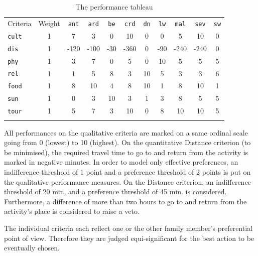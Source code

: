 \begin{table}[ht]
\caption{The performance tableau}
\label{tab:15.5}       %
\begin{center}
\begin{small}
    \begin{tabular}{l c|c c c c c c c c c}
      \svhline\noalign{\smallskip}
      Criteria & Weight & \texttt{ant} & \texttt{ard} & \texttt{be} & \texttt{crd} & \texttt{dn} & \texttt{lw} & \texttt{mal} & \texttt{sev} & \texttt{sw} \\
      \noalign{\smallskip}\hline\noalign{\smallskip}
      \texttt{cult} & 1 & 7    & 3    & 0   & 10   & 0 & 0   & 5    & 10   & 0\\
      \texttt{dis}  & 1 & -120 & -100 & -30 & -360 & 0 & -90 & -240 & -240 & 0\\
      \texttt{phy}  & 1 & 3    & 7    & 0   & 5    & 0 & 10  & 5    & 5    & 5\\
      \texttt{rel}  & 1 & 1    & 5    & 8   & 3    & 10 & 5  & 3    & 3   & 6\\
      \texttt{food} & 1 & 8    & 10   & 4   & 8    & 10 & 1  & 8    & 10  & 1\\
      \texttt{sun}  & 1 & 0    & 3    & 10  & 3    & 1  & 3  & 8    & 5   & 5\\
      \texttt{tour}  & 1 & 5   & 7    & 3   & 10   & 0  & 8  & 10   & 10  & 5\\
      \noalign{\smallskip}\hline
    \end{tabular}
\end{small}
\end{center}
\end{table}

All performances on the qualitative criteria are marked on a same ordinal scale going from 0 (lowest) to 10 (highest). On the quantitative Distance criterion (to be minimised), the required travel time to go to and return from the activity is marked in negative minutes. In order to model only effective preferences, an indifference threshold of 1 point and a preference threshold of 2 points is put on the qualitative performance measures. On the Distance criterion, an indifference threshold of 20 min, and a preference threshold of 45 min. is considered. Furthermore, a difference of more than two hours to go to and return from the activity’s place is considered to raise a veto.

The individual criteria each reflect one or the other family member’s preferential point of view. Therefore they are judged equi-significant for the best action to be eventually chosen.

